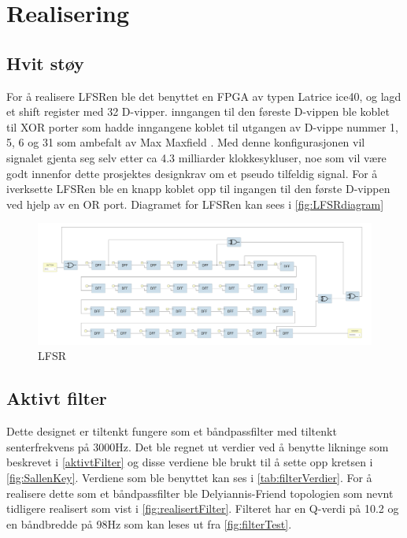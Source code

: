 \newpage
\section{Realisering}
\label{realiseringOgTest}

\subsection{Hvit støy}
\label{hvitStoeoy}
For å realisere LFSRen ble det benyttet en FPGA av typen Latrice ice40, og lagd et shift register med 32 D-vipper. inngangen til den føreste D-vippen ble koblet til XOR porter som hadde inngangene koblet til utgangen av D-vippe nummer 1, 5, 6 og 31 som ambefalt av Max Maxfield \cite{LFSR}. Med denne konfigurasjonen vil signalet gjenta seg selv etter ca 4.3 milliarder klokkesykluser, noe som vil være godt innenfor dette prosjektes designkrav om et pseudo tilfeldig signal. For å iverksette LFSRen ble en knapp koblet opp til ingangen til den første D-vippen ved hjelp av en OR port. Diagramet for LFSRen kan sees i \autoref{fig:LFSRdiagram}

\begin{figure} [!h]
\centering
\includegraphics[width=1\linewidth]{Bilder/LFSR.png}
\caption{LFSR}
\label{fig:LFSRdiagram}
\end{figure}

\subsection{Aktivt filter}
\label{aktivtFilterRealisering}
Dette designet er tiltenkt fungere som et båndpassfilter med tiltenkt senterfrekvens på 3000Hz. Det ble regnet ut verdier ved å benytte likninge som beskrevet i \autoref{aktivtFilter} og disse verdiene ble brukt til å sette opp kretsen i \autoref{fig:SallenKey}. Verdiene som ble benyttet kan ses i \autoref{tab:filterVerdier}. For å realisere dette som et båndpassfilter ble Delyiannis-Friend topologien som nevnt tidligere realisert som vist i \autoref{fig:realisertFilter}. Filteret har en Q-verdi på 10.2 og en båndbredde på 98Hz som kan leses ut fra \autoref{fig:filterTest}.

